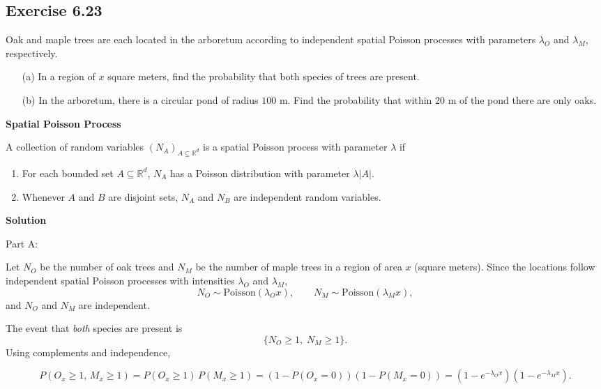 \documentclass[hidelinks]{article}
\begin{document}
\subsection{Exercise 6.23}

\noindent Oak and maple trees are each located in the arboretum according to independent spatial Poisson processes with parameters $\lambda_O$ and $\lambda_M$, respectively.

\begin{enumerate}
    \item[(a)] In a region of $x$ square meters, find the probability that both species of trees are present.
    
    \item[(b)] In the arboretum, there is a circular pond of radius $100$ m. Find the probability that within $20$ m of the pond there are only oaks.
\end{enumerate}

{\color{darkgreen}

\noindent \textbf{Spatial Poisson Process}

\noindent A collection of random variables $(N_A)_{A \subseteq \mathbb{R}^d}$ is a spatial Poisson process with parameter $\lambda$ if

\begin{enumerate}
    \item For each bounded set $A \subseteq \mathbb{R}^d$, $N_A$ has a Poisson distribution with parameter $\lambda |A|$.
    
    \item Whenever $A$ and $B$ are disjoint sets, $N_A$ and $N_B$ are independent random variables.
\end{enumerate}
}

\noindent \textbf{Solution}

\noindent Part A:

\noindent Let $N_O$ be the number of oak trees and $N_M$ be the number of maple trees in a region of area $x$ (square meters).
Since the locations follow independent spatial Poisson processes with intensities $\lambda_O$ and $\lambda_M$,
\[
N_O \sim \mathrm{Poisson}(\lambda_O x), 
\qquad
N_M \sim \mathrm{Poisson}(\lambda_M x),
\]
and $N_O$ and $N_M$ are independent.

\noindent The event that \emph{both} species are present is
\[
\{N_O \ge 1,\; N_M \ge 1\}.
\]
Using complements and independence,

\[
P(O_x \ge 1,\, M_x \ge 1)
= P(O_x \ge 1)\, P(M_x \ge 1)
= (1 - P(O_x = 0))(1 - P(M_x = 0))
= (1 - e^{-\lambda_O x})(1 - e^{-\lambda_M x}).
\]
\end{document}
